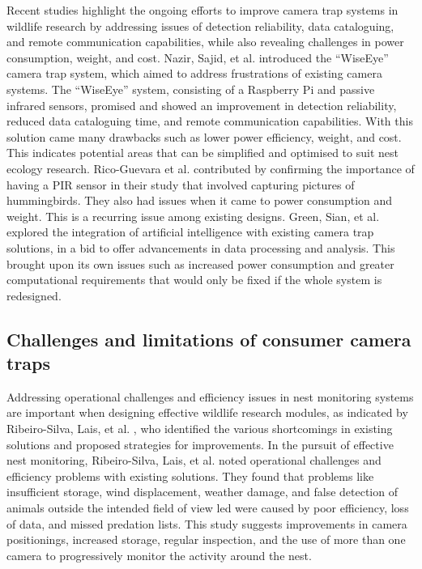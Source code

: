 \documentclass[class=report,11pt,crop=false]{standalone}
\begin{document}
Recent studies highlight the ongoing efforts to improve camera trap systems in wildlife research by addressing issues of detection reliability, data cataloguing, and remote communication capabilities, while also revealing challenges in power consumption, weight, and cost. Nazir, Sajid, et al. \cite{nazir2017wiseeye} introduced the “WiseEye” camera trap system, which aimed to address frustrations of existing camera systems. The “WiseEye” system, consisting of a Raspberry Pi and passive infrared sensors, promised and showed an improvement in detection reliability, reduced data cataloguing time, and remote communication capabilities. With this solution came many drawbacks such as lower power efficiency, weight, and cost. This indicates potential areas that can be simplified and optimised to suit nest ecology research. Rico-Guevara et al. \cite{rico-guevara2017bring} contributed by confirming the importance of having a PIR sensor in their study that involved capturing pictures of hummingbirds. They also had issues when it came to power consumption and weight. This is a recurring issue among existing designs. Green, Sian, et al. \cite{green2020innovations} explored the integration of artificial intelligence with existing camera trap solutions, in a bid to offer advancements in data processing and analysis. This brought upon its own issues such as increased power consumption and greater computational requirements that would only be fixed if the whole system is redesigned. 

\subsection{Challenges and limitations of consumer camera traps}

Addressing operational challenges and efficiency issues in nest monitoring systems are important when designing effective wildlife research modules, as indicated by Ribeiro-Silva, Lais, et al. \cite{ribeiro-silva2018testing}, who identified the various shortcomings in existing solutions and proposed strategies for improvements. In the pursuit of effective nest monitoring, Ribeiro-Silva, Lais, et al. \cite{ribeiro-silva2018testing} noted operational challenges and efficiency problems with existing solutions. They found that problems like insufficient storage, wind displacement, weather damage, and false detection of animals outside the intended field of view led were caused by poor efficiency, loss of data, and missed predation lists. This study suggests improvements in camera positionings, increased storage, regular inspection, and the use of more than one camera to progressively monitor the activity around the nest. 
\end{document}
